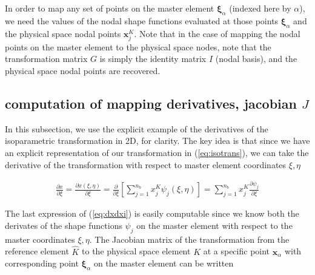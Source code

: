 \documentclass[10pt]{article}
\begin{document}
In order to map any set of points on the master element $\bm{\xi}_\alpha$ (indexed here by
$\alpha$), we need the values of the nodal shape functions evaluated at those points
$\bm{\xi}_\alpha$ and the physical space nodal points $\bm{x}_j^K$. Note that in the case of mapping
the nodal points on the master element to the physical space nodes, note that the transformation
matrix $G$ is simply the identity matrix $I$ (nodal basis), and the physical space nodal points are
recovered.

\subsection{computation of mapping derivatives, jacobian $J$}

In this subsection, we use the explicit example of the derivatives of the isoparametric
transformation in 2D, for clarity. The key idea is that since we have an explicit representation of
our transformation in (\ref{eq:isotrans}), we can take the derivative of the transformation with
respect to master element coordinates $\xi, \eta$

\begin{align}
  \frac{\partial x}{\partial \xi} =
  \frac{\partial x(\xi,\eta)}{\partial \xi}
  = \frac{\partial }{\partial \xi}\left[\sum_{j=1}^{n_b} x_j^K \psi_j(\xi, \eta)\right]
  =\sum_{j=1}^{n_b} x_j^K \frac{\partial \psi_j}{\partial \xi}
  \label{eq:dxdxi}
\end{align}

The last expression of (\ref{eq:dxdxi}) is easily computable since we know both the derivates of the
shape functions $\psi_j$ on the master element with respect to the master coordinates $\xi, \eta$.
The Jacobian matrix of the transformation from the reference element $\widehat{K}$ to the physical
space element $K$ at a specific point $\bm{x}_\alpha$ with corresponding point $\bm{\xi}_\alpha$ on
the master element can be written
\end{document}
